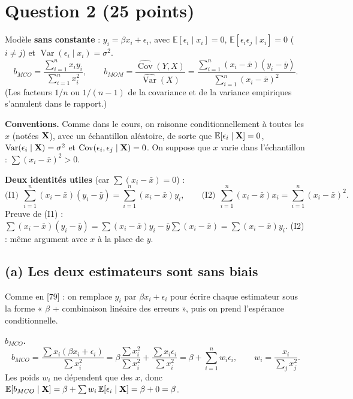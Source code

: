 \documentclass[11pt,a4paper]{article}
\newcommand{\E}{\mathbb{E}}\newcommand{\Var}{\operatorname{Var}}\newcommand{\Cov}{\operatorname{Cov}}
\newcommand{\sumi}{\sum_{i=1}^{n}}
\begin{document}
\section{Question 2 (25 points)}

Modèle \textbf{sans constante} : $y_i=\beta x_i+\epsilon_i$, avec $\E[\epsilon_i\mid x_i]=0$, $\E[\epsilon_i\epsilon_j\mid x_i]=0$ ($i\ne j$) et $\Var(\epsilon_i\mid x_i)=\sigma^2$.
\[
b_{MCO}=\frac{\sumi x_iy_i}{\sumi x_i^2},\qquad
b_{MOM}=\frac{\widehat{\Cov}(Y,X)}{\widehat{\Var}(X)}=\frac{\sumi(x_i-\bar x)(y_i-\bar y)}{\sumi(x_i-\bar x)^2}.
\]
(Les facteurs $1/n$ ou $1/(n-1)$ de la covariance et de la variance empiriques s'annulent dans le rapport.)

\textbf{Conventions.} Comme dans le cours, on raisonne conditionnellement à toutes les $x$ (notées $\mathbf{X}$), avec un échantillon aléatoire, de sorte que $\E[\epsilon_i\mid\vX]=0$, $\Var(\epsilon_i\mid\vX)=\sigma^2$ et $\Cov(\epsilon_i,\epsilon_j\mid\vX)=0$. On suppose que $x$ varie dans l'échantillon : $\sum(x_i-\bar x)^2>0$.

\textbf{Deux identités utiles} (car $\sum(x_i-\bar x)=0$) :
\[
\text{(I1)}\ \ \sumi(x_i-\bar x)(y_i-\bar y)=\sumi(x_i-\bar x)y_i,
\qquad
\text{(I2)}\ \ \sumi(x_i-\bar x)x_i=\sumi(x_i-\bar x)^2 .
\]
Preuve de (I1) : $\sum(x_i-\bar x)(y_i-\bar y)=\sum(x_i-\bar x)y_i-\bar y\sum(x_i-\bar x)=\sum(x_i-\bar x)y_i$. (I2) : même argument avec $x$ à la place de $y$.

\subsection{(a) Les deux estimateurs sont sans biais}

\begin{idee}
Comme en [79] : on remplace $y_i$ par $\beta x_i+\epsilon_i$ pour écrire chaque estimateur sous la forme « $\beta$ + combinaison linéaire des erreurs », puis on prend l'espérance conditionnelle.
\end{idee}

\textbf{$b_{MCO}$.}
\[
b_{MCO}=\frac{\sum x_i(\beta x_i+\epsilon_i)}{\sum x_i^2}=\beta\frac{\sum x_i^2}{\sum x_i^2}+\frac{\sum x_i\epsilon_i}{\sum x_i^2}=\beta+\sumi w_i\epsilon_i,\qquad w_i=\frac{x_i}{\sum_j x_j^2}.
\]
Les poids $w_i$ ne dépendent que des $x$, donc
$\E[b_{MCO}\mid\vX]=\beta+\sum w_i\,\E[\epsilon_i\mid\vX]=\beta+0=\beta$.
\end{document}
